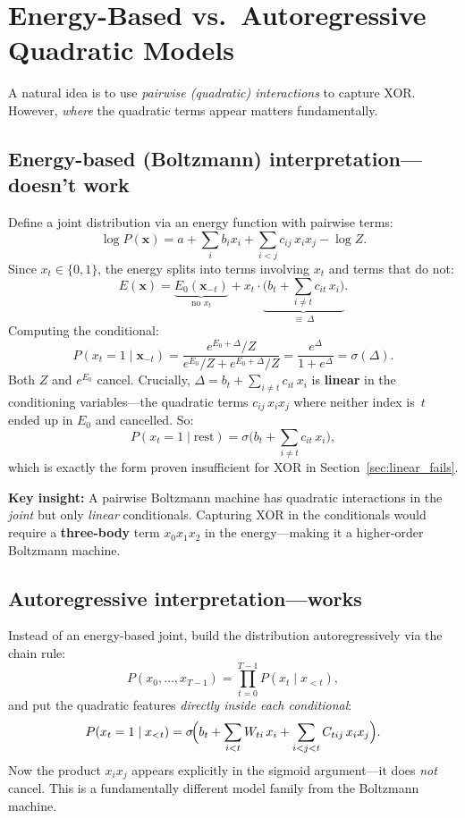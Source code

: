 \documentclass[11pt]{article}
\begin{document}
\section{Energy-Based vs.\ Autoregressive Quadratic
         Models}\label{sec:subtlety}

A natural idea is to use \emph{pairwise (quadratic) interactions} to
capture XOR.  However, \emph{where} the quadratic terms appear matters
fundamentally.

\subsection{Energy-based (Boltzmann) interpretation---doesn't
            work}\label{sec:boltzmann}

Define a joint distribution via an energy function with pairwise terms:
\[
  \log P(\mathbf{x})
  = a + \sum_i b_i x_i + \sum_{i<j} c_{ij}\, x_i x_j - \log Z.
\]
Since $x_t \in \{0,1\}$, the energy splits into terms involving $x_t$
and terms that do not:
\[
  E(\mathbf{x})
  = \underbrace{E_0(\mathbf{x}_{-t})}_{\text{no } x_t}
  + x_t \cdot \underbrace{\bigl(b_t
    + \textstyle\sum_{i \neq t} c_{it}\, x_i\bigr)}_{\displaystyle
    \equiv\;\Delta}.
\]
Computing the conditional:
\[
  P(x_t = 1 \mid \mathbf{x}_{-t})
  = \frac{e^{E_0 + \Delta}/Z}{e^{E_0}/Z + e^{E_0+\Delta}/Z}
  = \frac{e^{\Delta}}{1 + e^{\Delta}}
  = \sigma(\Delta).
\]
Both $Z$ and $e^{E_0}$ cancel.  Crucially,
$\Delta = b_t + \sum_{i\neq t} c_{it}\,x_i$ is \textbf{linear} in the
conditioning variables---the quadratic terms $c_{ij}\,x_i x_j$ where
neither index is~$t$ ended up in $E_0$ and cancelled.  So:
\[
  P(x_t = 1 \mid \text{rest}) = \sigma\!\bigl(b_t
    + \textstyle\sum_{i\neq t} c_{it}\, x_i\bigr),
\]
which is exactly the form proven insufficient for XOR in
Section~\ref{sec:linear_fails}.

\textbf{Key insight:} A pairwise Boltzmann machine has quadratic
interactions in the \emph{joint} but only \emph{linear} conditionals.
Capturing XOR in the conditionals would require a \textbf{three-body}
term $x_0 x_1 x_2$ in the energy---making it a higher-order Boltzmann
machine.

\subsection{Autoregressive interpretation---works}\label{sec:ar}

Instead of an energy-based joint, build the distribution
autoregressively via the chain rule:
\[
  P(x_0, \ldots, x_{T-1})
  = \prod_{t=0}^{T-1} P(x_t \mid x_{<t}),
\]
and put the quadratic features \emph{directly inside each conditional}:
\begin{equation}\label{eq:ar_conditional}
  P(x_t = 1 \mid x_{<t})
  = \sigma\!\Bigl(b_t + \sum_{i<t} W_{ti}\, x_i
    + \sum_{i<j<t} C_{tij}\, x_i x_j\Bigr).
\end{equation}
Now the product $x_i x_j$ appears explicitly in the sigmoid
argument---it does \emph{not} cancel.  This is a fundamentally different
model family from the Boltzmann machine.
\end{document}
